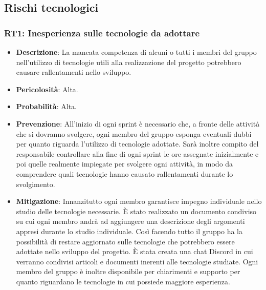 \subsection{Rischi tecnologici}

\subsubsection{RT1: Inesperienza sulle tecnologie da adottare}
\begin{itemize}
    \item \textbf{Descrizione}: La mancata competenza di alcuni o tutti i membri del gruppo nell'utilizzo di tecnologie utili alla realizzazione del progetto potrebbero causare rallentamenti nello sviluppo. 
    \item \textbf{Pericolosità}: Alta.
    \item \textbf{Probabilità}: Alta.
    \item \textbf{Prevenzione}: All'inizio di ogni sprint è necessario che, a fronte delle attività che si dovranno svolgere, ogni membro del gruppo esponga eventuali dubbi per quanto riguarda l'utilizzo di tecnologie adottate. 
    Sarà inoltre compito del responsabile controllare alla fine di ogni sprint le ore assegnate inizialmente e poi quelle realmente impiegate per svolgere ogni attività, in modo da comprendere quali tecnologie hanno causato rallentamenti durante lo svolgimento.
    \item \textbf{Mitigazione}:  Innanzitutto ogni membro garantisce impegno individuale nello studio delle tecnologie necessarie.
    È stato realizzato un documento condiviso su cui ogni membro andrà ad aggiungere una descrizione degli argomenti appresi durante lo studio individuale.
    Così facendo tutto il gruppo ha la possibilità di restare aggiornato sulle tecnologie che potrebbero essere adottate nello sviluppo del progetto.
    È stata creata una chat Discord in cui verranno condivisi articoli e documenti inerenti alle tecnologie studiate.
    Ogni membro del gruppo è inoltre disponibile per chiarimenti e supporto per quanto riguardano le tecnologie in cui possiede maggiore esperienza.
\end{itemize}

